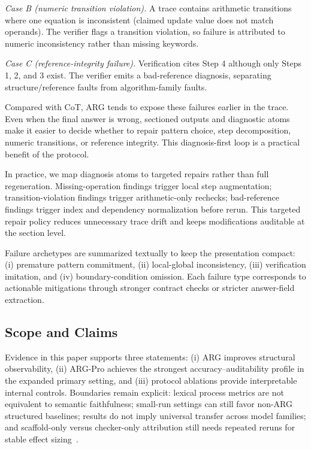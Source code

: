 \documentclass{article}
\begin{document}
\emph{Case B (numeric transition violation).} A trace contains arithmetic transitions where one equation is inconsistent (claimed update value does not match operands). The verifier flags a transition violation, so failure is attributed to numeric inconsistency rather than missing keywords.

\emph{Case C (reference-integrity failure).} Verification cites Step 4 although only Steps 1, 2, and 3 exist. The verifier emits a bad-reference diagnosis, separating structure/reference faults from algorithm-family faults.

Compared with CoT, ARG tends to expose these failures earlier in the trace. Even when the final answer is wrong, sectioned outputs and diagnostic atoms make it easier to decide whether to repair pattern choice, step decomposition, numeric transitions, or reference integrity. This diagnosis-first loop is a practical benefit of the protocol.

In practice, we map diagnosis atoms to targeted repairs rather than full regeneration. Missing-operation findings trigger local step augmentation; transition-violation findings trigger arithmetic-only rechecks; bad-reference findings trigger index and dependency normalization before rerun. This targeted repair policy reduces unnecessary trace drift and keeps modifications auditable at the section level.

Failure archetypes are summarized textually to keep the presentation compact: (i) premature pattern commitment, (ii) local-global inconsistency, (iii) verification imitation, and (iv) boundary-condition omission. Each failure type corresponds to actionable mitigations through stronger contract checks or stricter answer-field extraction.

\subsection{Scope and Claims}
Evidence in this paper supports three statements: (i) ARG improves structural observability, (ii) ARG-Pro achieves the strongest accuracy--auditability profile in the expanded primary setting, and (iii) protocol ablations provide interpretable internal controls. Boundaries remain explicit: lexical process metrics are not equivalent to semantic faithfulness; small-run settings can still favor non-ARG structured baselines; results do not imply universal transfer across model families; and scaffold-only versus checker-only attribution still needs repeated reruns for stable effect sizing~\cite{doshi2017towards,lipton2018mythos,jacovi2020towards}.
\end{document}
